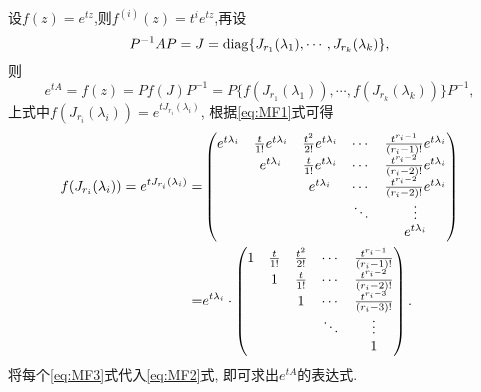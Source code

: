   \begin{solution}
    设$f(z)=e^{tz}$,则$f^{(i)}(z)=t^ie^{tz}$,再设
    \[P^{-1}AP = J = \operatorname{diag}\{J_{r_1}(\lambda_1),\cdots,J_{r_k}(\lambda_k)\},\]
    则
    \begin{equation}\label{eq:MF2}
      e^{tA}=f(z)=Pf(J)P^{-1}=P\{f(J_{r_1}(\lambda_1)),\cdots,f(J_{r_k}(\lambda_k))\}P^{-1},
    \end{equation}
    上式中$f(J_{r_i}(\lambda_i))=e^{tJ_{r_i}(\lambda_i)}$,
    根据\eqref{eq:MF1}式可得
    \begin{align}
       f(J_{r_i}(\lambda_i))=e^{tJ_{r_i}(\lambda_i)}= &
       \begin{pmatrix}
         e^{t\lambda_i}&\frac{t}{1!}e^{t\lambda_i}&\frac{t^2}{2!}e^{t\lambda_i}&\cdots&\frac{t^{r_i-1}}{(r_i-1)!}e^{t\lambda_i}\\
                       &e^{t\lambda_i}&\frac{t}{1!}e^{t\lambda_i}&\cdots&\frac{t^{r_i-2}}{(r_i-2)!}e^{t\lambda_i}\\
                       &&e^{t\lambda_i}&\cdots&\frac{t^{r_i-2}}{(r_i-2)!}e^{t\lambda_i}\\
                       &&&\ddots&\vdots\\
         &&&&e^{t\lambda_i}
       \end{pmatrix}\notag\\
       = & e^{t\lambda_i}\cdot
       \begin{pmatrix}
         1&\frac{t}{1!}&\frac{t^2}{2!}&\cdots&\frac{t^{r_i-1}}{(r_i-1)!}\\
          &1&\frac{t}{1!}&\cdots&\frac{t^{r_i-2}}{(r_i-2)!}\\
          &&1&\cdots&\frac{t^{r_i-3}}{(r_i-3)!}\\
          &&&\ddots&\vdots\\
         &&&&1
       \end{pmatrix}.\label{eq:MF3}
    \end{align}
    将每个\eqref{eq:MF3}式代入\eqref{eq:MF2}式,
    即可求出$e^{tA}$的表达式.
  \end{solution}
